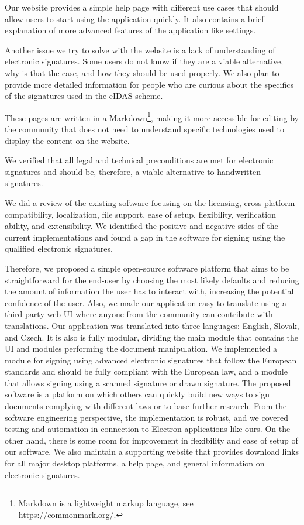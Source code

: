 \documentclass[thesismargins, english, thesislinespacing, onelinechapterstyle, upjsfrontpage]{rnthesis}
\begin{document}
Our website provides a simple help page with different use cases that should allow users to start using the application quickly.
It also contains a brief explanation of more advanced features of the application like settings.

Another issue we try to solve with the website is a lack of understanding of electronic signatures.
Some users do not know if they are a viable alternative, why is that the case, and how they should be used properly.
We also plan to provide more detailed information for people who are curious about the specifics of the signatures used in the eIDAS scheme.

These pages are written in a Markdown\footnote{Markdown is a lightweight markup language, see \url{https://commonmark.org/}.}, making it more accessible for editing by the community that does not need to understand specific technologies used to display the content on the website.

\zaver

We verified that all legal and technical preconditions are met for electronic signatures and should be, therefore, a viable alternative to handwritten signatures.

We did a review of the existing software focusing on the licensing, cross-platform compatibility, localization, file support, ease of setup, flexibility, verification ability, and extensibility.
We identified the positive and negative sides of the current implementations and found a gap in the software for signing using the qualified electronic signatures.

Therefore, we proposed a simple open-source software platform that aims to be straightforward for the end-user by choosing the most likely defaults and reducing the amount of information the user has to interact with, increasing the potential confidence of the user.
Also, we made our application easy to translate using a third-party web UI where anyone from the community can contribute with translations.
Our application was translated into three languages: English, Slovak, and Czech.
It is also is fully modular, dividing the main module that contains the UI and modules performing the document manipulation.
We implemented a module for signing using advanced electronic signatures that follow the European standards and should be fully compliant with the European law, and a module that allows signing using a scanned signature or drawn signature.
The proposed software is a platform on which others can quickly build new ways to sign documents complying with different laws or to base further research.
From the software engineering perspective, the implementation is robust, and we covered testing and automation in connection to Electron applications like ours.
On the other hand, there is some room for improvement in flexibility and ease of setup of our software.
We also maintain a supporting website that provides download links for all major desktop platforms, a help page, and general information on electronic signatures.
\end{document}
